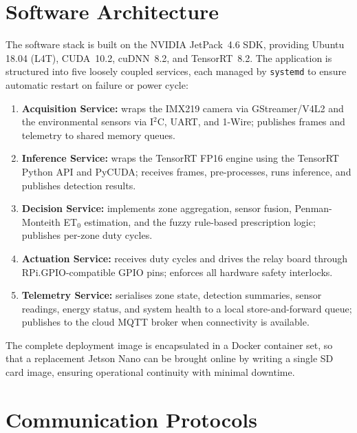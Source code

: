 \documentclass[12pt,a4paper]{report}
\begin{document}
\section{Software Architecture}

The software stack is built on the NVIDIA JetPack~4.6 SDK, providing Ubuntu 18.04 (L4T), CUDA~10.2, cuDNN~8.2, and TensorRT~8.2. The application is structured into five loosely coupled services, each managed by \texttt{systemd} to ensure automatic restart on failure or power cycle:

\begin{enumerate}
    \item \textbf{Acquisition Service:} wraps the IMX219 camera via GStreamer/V4L2 and the environmental sensors via I$^2$C, UART, and 1-Wire; publishes frames and telemetry to shared memory queues.
    \item \textbf{Inference Service:} wraps the TensorRT FP16 engine using the TensorRT Python API and PyCUDA; receives frames, pre-processes, runs inference, and publishes detection results.
    \item \textbf{Decision Service:} implements zone aggregation, sensor fusion, Penman-Monteith ET$_0$ estimation, and the fuzzy rule-based prescription logic; publishes per-zone duty cycles.
    \item \textbf{Actuation Service:} receives duty cycles and drives the relay board through RPi.GPIO-compatible GPIO pins; enforces all hardware safety interlocks.
    \item \textbf{Telemetry Service:} serialises zone state, detection summaries, sensor readings, energy status, and system health to a local store-and-forward queue; publishes to the cloud MQTT broker when connectivity is available.
\end{enumerate}

The complete deployment image is encapsulated in a Docker container set, so that a replacement Jetson Nano can be brought online by writing a single SD card image, ensuring operational continuity with minimal downtime.

\section{Communication Protocols}
\end{document}
